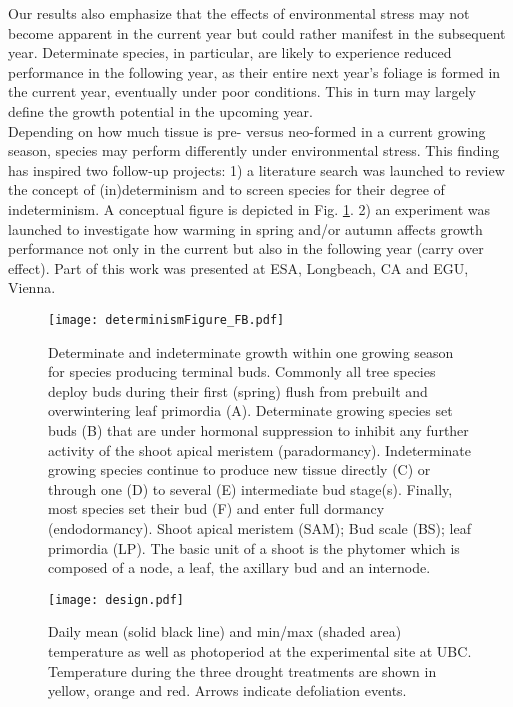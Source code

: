 \documentclass{article}
\begin{document}
			Our results also emphasize that the effects of environmental stress may not become apparent in the current year but could rather manifest in the subsequent year. Determinate species, in particular, are likely to experience reduced performance in the following year, as their entire next year's foliage is formed in the current year, eventually under poor conditions. This in turn may largely define the growth potential  in the upcoming year.\\
			
			Depending on how much tissue is pre- versus neo-formed in a current growing season, species may perform differently under environmental stress. This finding has inspired two follow-up projects: 1) a literature search was launched to review the concept of (in)determinism and to screen species for their degree of indeterminism. A conceptual figure is depicted in Fig. \ref{fig:determinismFigure_FB}. 2) an experiment was launched to investigate how warming in spring and/or autumn affects growth performance not only in the current but also in the following year (carry over effect). Part of this work was presented at ESA, Longbeach, CA and EGU, Vienna. 
			
	\begin{figure}[H]
	\centering
	\texttt{[image: determinismFigure\_FB.pdf]} 
	\caption{Determinate and indeterminate growth within one growing season for species producing terminal buds. Commonly all tree species deploy buds during their first (spring) flush from prebuilt and overwintering leaf primordia (A). Determinate growing species set buds (B) that are under hormonal suppression to inhibit any further activity of the shoot apical meristem (paradormancy). Indeterminate growing species continue to produce new tissue directly (C) or through one (D) to several (E) intermediate bud stage(s). Finally, most species set their bud (F) and enter full dormancy (endodormancy). Shoot apical meristem (SAM); Bud scale (BS); leaf primordia (LP). The basic unit of a shoot is the phytomer which is composed of a node, a leaf, the axillary bud and an internode.}
	\label{fig:determinismFigure_FB}
	\end{figure}
	
	
		\begin{figure}[H]
	\centering
	\texttt{[image: design.pdf]} 
	\caption{Daily mean (solid black line) and min/max (shaded area) temperature as well as photoperiod at the experimental site at UBC. Temperature during the three drought treatments are shown in yellow, orange and red. Arrows indicate defoliation events.}
	\label{fig:design}
\end{figure}
	

	
	

	
	

	
	
	

	
	
	
	
	\newpage
	
	
	
	
	
	
	
	
	
	
\end{document}
